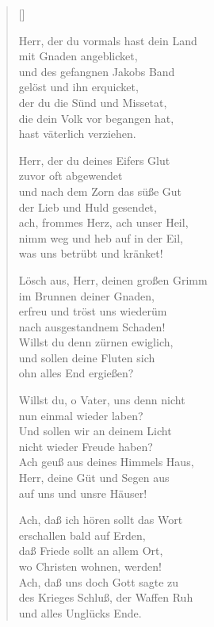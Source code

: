 \begin{multicols}{2}
\settowidth{\versewidth}{Herr, der du vormals hast dein Land}
\begin{verse}[\versewidth]

 Herr, der du vormals hast dein Land\\
mit Gnaden angeblicket,\\
und des gefangnen Jakobs Band\\
gelöst und ihn erquicket,\\
der du die Sünd und Missetat,\\
die dein Volk vor begangen hat,\\
hast väterlich verziehen.

 Herr, der du deines Eifers Glut\\
zuvor oft abgewendet\\
und nach dem Zorn das süße Gut\\
der Lieb und Huld gesendet,\\
ach, frommes Herz, ach unser Heil,\\
nimm weg und heb auf in der Eil,\\
was uns betrübt und kränket!

 Lösch aus, Herr, deinen großen Grimm\\
im Brunnen deiner Gnaden,\\
erfreu und tröst uns wiederüm\\
nach ausgestandnem Schaden!\\
Willst du denn zürnen ewiglich,\\
und sollen deine Fluten sich\\
ohn alles End ergießen?

 Willst du, o Vater, uns denn nicht\\
nun einmal wieder laben?\\
Und sollen wir an deinem Licht\\
nicht wieder Freude haben?\\
Ach geuß aus deines Himmels Haus,\\
Herr, deine Güt und Segen aus\\
auf uns und unsre Häuser!

 Ach, daß ich hören sollt das Wort\\
erschallen bald auf Erden,\\
daß Friede sollt an allem Ort,\\
wo Christen wohnen, werden!\\
Ach, daß uns doch Gott sagte zu\\
des Krieges Schluß, der Waffen Ruh\\
und alles Unglücks Ende.


\end{verse}
\end{multicols}
